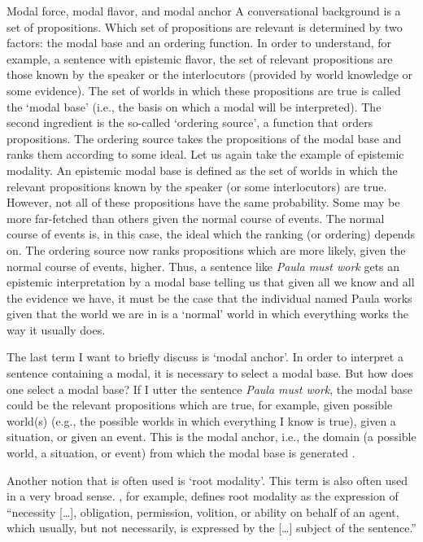 \begin{digression}{{Modal force, modal flavor, and modal anchor}}{}
A conversational background is a set of propositions. Which set of propositions are relevant is determined by two factors: the modal base and an ordering function. In order to understand, for example, a sentence with epistemic flavor, the set of relevant propositions are those known by the speaker or the interlocutors (provided by world knowledge or some evidence).  The set of worlds in which these propositions are true is called the `modal base' (i.e., the basis on which a modal will be interpreted). The second ingredient is the so-called `ordering source', a function that orders propositions. The ordering source takes the propositions of the modal base and ranks them according to some ideal. Let us again take the example of epistemic modality. An epistemic modal base is defined as the set of worlds in which the relevant propositions known by the speaker (or some interlocutors) are true. However, not all of these propositions have the same probability. Some may be more far-fetched than others given the normal course of events. The normal course of events is, in this case, the ideal which the ranking (or ordering) depends on. The ordering source now ranks propositions which are more likely, given the normal course of events, higher. Thus, a sentence like \textit{Paula must work} gets an epistemic interpretation by a modal base telling us that given all we know and all the evidence we have, it must be the case that the individual named Paula works given that the world we are in is a `normal' world in which everything works the way it usually does.

The last term I want to briefly discuss is `modal anchor'. In order to interpret a sentence containing a modal, it is necessary to select a modal base. But how does one select a modal base? If I utter the sentence \textit{Paula must work}, the modal base could be the relevant propositions which are true, for example, given possible world(s) (e.g., the possible worlds in which everything I know is true), given a situation, or given an event. This is the modal anchor, i.e., the domain (a possible world, a situation, or event) from which the modal base is generated \citep{mckenzie2018latent}.   
\end{digression}


\noindent Another notion that is often used is `root modality'. This term is also often used in a very broad sense. \citet[44]{platzack1979semantic}, for example, defines root modality as the expression of ``necessity [\dots ], obligation, permission, volition, or ability on behalf of an agent, which usually, but not necessarily, is expressed by the [\dots ] subject of the sentence.''


